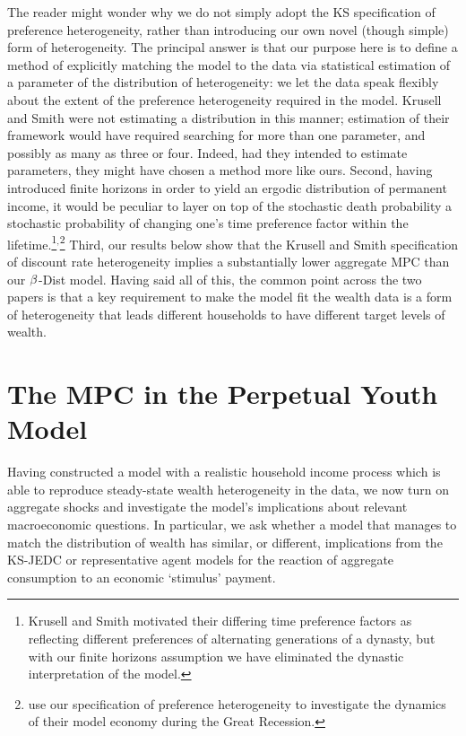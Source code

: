 \documentclass[12pt,titlepage]{econtex}
\begin{document}
The reader might wonder why we do not simply adopt the KS
specification of preference heterogeneity, rather than
introducing our own novel (though simple) form of heterogeneity.  The
principal answer is that our purpose here is to define a method of
explicitly matching the model to the data via statistical estimation
of a parameter of the distribution of heterogeneity: we let the data
speak flexibly about the extent of the preference heterogeneity
required in the model.  Krusell and Smith were not estimating
a distribution in this manner; estimation of their framework would have required
searching for more than one parameter, and possibly as many as three or four.  Indeed, had they intended
to estimate parameters, they might have chosen
a method more like ours.  Second, having
introduced finite horizons in order to yield an ergodic distribution
of permanent income, it would be peculiar to layer on top of the
stochastic death probability a stochastic probability of changing
one's time preference factor within the lifetime.\footnote{Krusell and Smith
motivated their differing time preference factors as reflecting
different preferences of alternating generations of a dynasty, but
with our finite horizons assumption we have eliminated the dynastic
interpretation of the model.}${}^,$\footnote{\cite{kruegerMitmanPerri:handbookMacro} use our specification of preference heterogeneity to investigate the dynamics of their model economy during the Great Recession.}
 Third, our results below show that the Krusell and Smith
specification of discount rate heterogeneity implies a substantially lower aggregate MPC than our $\beta$-Dist model.  Having said all of this, the common
point across the two papers is that a key requirement to make the
model fit the wealth data is a form of heterogeneity that leads different
households to have different target levels of wealth.

\section{The MPC in the Perpetual Youth Model} \label{sec:MPC}


Having constructed a model with a realistic household income process which is able to reproduce steady-state wealth heterogeneity in the data, we now turn on aggregate shocks and investigate the model's implications about relevant macroeconomic questions.
In particular, we ask whether a
model that manages to match the distribution of wealth has similar, or
different, implications from the KS-JEDC or representative agent
models for the reaction of aggregate consumption to an economic
`stimulus' payment.
\end{document}
